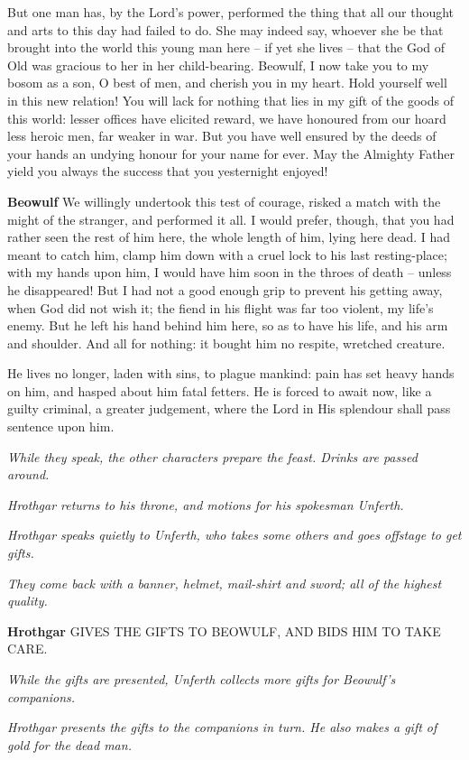 \documentclass[a4paper]{article}
\begin{document}
{But one man has,
by the Lord’s power, performed the thing
that all our thought and arts to this day
had failed to do. She may indeed say,
whoever she be that brought into the world
this young man here – if yet she lives –
that the God of Old was gracious to her
in her child-bearing. Beowulf, I now take you
to my bosom as a son, O best of men,
and cherish you in my heart. Hold yourself well
in this new relation! You will lack for nothing
that lies in my gift of the goods of this world:
lesser offices have elicited reward,
we have honoured from our hoard less heroic men,
far weaker in war. But you have well ensured
by the deeds of your hands an undying honour
for your name for ever. May the Almighty Father
yield you always the success that you yesternight enjoyed!

\textbf{Beowulf} We willingly undertook this test of courage,
risked a match with the might of the stranger,
and performed it all. I would prefer, though,
that you had rather seen the rest of him here,
the whole length of him, lying here dead.
I had meant to catch him, clamp him down
with a cruel lock to his last resting-place;
with my hands upon him, I would have him soon
in the throes of death – unless he disappeared!
But I had not a good enough grip to prevent
his getting away, when God did not wish it;
the fiend in his flight was far too violent,
my life’s enemy. But he left his hand
behind him here, so as to have his life,
and his arm and shoulder. And all for nothing:
it bought him no respite, wretched creature.

He lives no longer, laden with sins,
to plague mankind: pain has set
heavy hands on him, and hasped about him
fatal fetters. He is forced to await now,
like a guilty criminal, a greater judgement,
where the Lord in His splendour shall pass sentence upon him.

\centerline{\textit{While they speak, the other characters prepare the feast. Drinks are passed around.}}
\centerline{\textit{Hrothgar returns to his throne, and motions for his spokesman Unferth.}}

\centerline{\textit{Hrothgar speaks quietly to Unferth, who takes some others and goes offstage to get gifts.}}
\centerline{\textit{They come back with a banner, helmet, mail-shirt and sword; all of the highest quality.}}

\textbf{Hrothgar} GIVES THE GIFTS TO BEOWULF, AND BIDS HIM TO TAKE CARE.

\centerline{\textit{While the gifts are presented, Unferth collects more gifts for Beowulf's companions.}}
\centerline{\textit{Hrothgar presents the gifts to the companions in turn. He also makes a gift of gold for the dead man.}}

}
\end{document}
